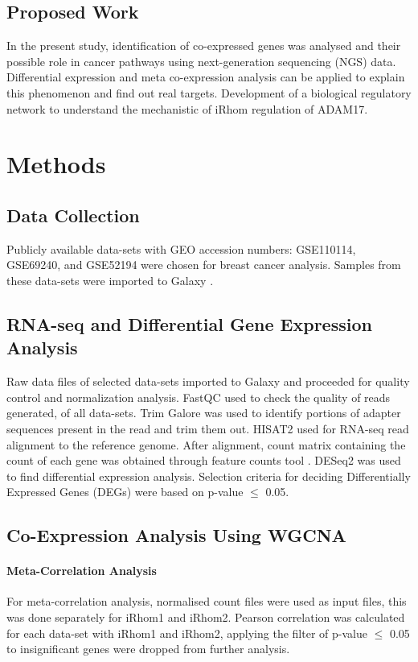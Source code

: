 \documentclass[fleqn,10pt,lineno]{wlpeerj}
\begin{document}
\subsection*{Proposed Work}

In the present study, identification of co-expressed genes was analysed and their possible role in cancer pathways using next-generation sequencing (NGS) data. Differential expression and meta co-expression analysis can be applied to explain this phenomenon and find out real targets. Development of a biological regulatory network to understand the mechanistic of iRhom regulation of ADAM17.

\section*{Methods}

\subsection*{Data Collection}

Publicly available data-sets with GEO accession numbers: GSE110114, GSE69240, and GSE52194 were chosen for breast cancer analysis. Samples from these data-sets were imported to Galaxy \citep{Afgan2018}.

\subsection*{RNA-seq and Differential Gene Expression Analysis}
Raw data files of selected data-sets imported to Galaxy and proceeded for quality control and normalization analysis. FastQC used to check the quality of reads generated, of all data-sets. Trim Galore \citep{Krueger2016} was used to identify portions of adapter sequences present in the read and trim them out.  HISAT2 \citep{Kim2015} used for RNA-seq read alignment to the reference genome. After alignment, count matrix containing the count of each gene was obtained through feature counts tool \citep{Stephani2011}. DESeq2 was used to find differential expression analysis. Selection criteria for deciding Differentially Expressed Genes (DEGs) were based on p-value $\leq$ 0.05.


\subsection*{Co-Expression Analysis Using WGCNA}
\paragraph{Meta-Correlation Analysis}
For meta-correlation analysis, normalised count files were used as input files, this was done separately for iRhom1 and iRhom2. Pearson correlation was calculated for each data-set with iRhom1 and iRhom2, applying the filter of p-value $\leq$ 0.05  to insignificant genes were dropped from further analysis. 
\end{document}
